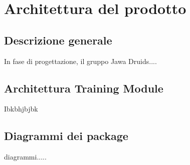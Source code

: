 \chapter{Architettura del prodotto}

\section{Descrizione generale}
In fase di progettazione, il gruppo Jawa Druids.... 
\section{Architettura Training Module}
Ibkbhjbjbk
\section{Diagrammi dei package}
diagrammi.....
